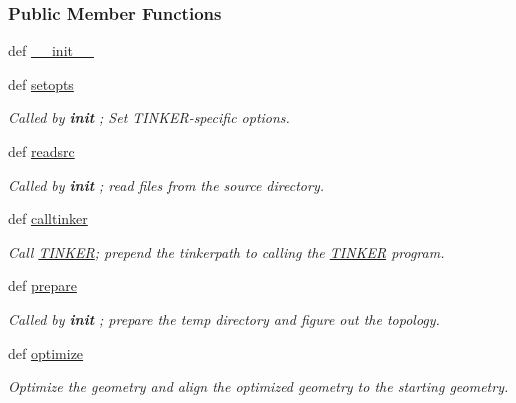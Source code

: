 \subsubsection*{Public Member Functions}
\begin{DoxyCompactItemize}
\item 
def \hyperlink{classforcebalance_1_1tinkerio_1_1TINKER_acf3c691c3b992262820a8e71cabefa32}{\-\_\-\-\_\-init\-\_\-\-\_\-}
\item 
def \hyperlink{classforcebalance_1_1tinkerio_1_1TINKER_a7b620772ae2ee1b71d91e45e19627d3d}{setopts}
\begin{DoxyCompactList}\small\item\em Called by {\bfseries init} ; Set T\-I\-N\-K\-E\-R-\/specific options. \end{DoxyCompactList}\item 
def \hyperlink{classforcebalance_1_1tinkerio_1_1TINKER_ac5490b42e2a13be406cd1701789b72b4}{readsrc}
\begin{DoxyCompactList}\small\item\em Called by {\bfseries init} ; read files from the source directory. \end{DoxyCompactList}\item 
def \hyperlink{classforcebalance_1_1tinkerio_1_1TINKER_addfa1257c7cb85c51c980474c7354cab}{calltinker}
\begin{DoxyCompactList}\small\item\em Call \hyperlink{classforcebalance_1_1tinkerio_1_1TINKER}{T\-I\-N\-K\-E\-R}; prepend the tinkerpath to calling the \hyperlink{classforcebalance_1_1tinkerio_1_1TINKER}{T\-I\-N\-K\-E\-R} program. \end{DoxyCompactList}\item 
def \hyperlink{classforcebalance_1_1tinkerio_1_1TINKER_adf31eba4afc23ec8326fc8b6461f5692}{prepare}
\begin{DoxyCompactList}\small\item\em Called by {\bfseries init} ; prepare the temp directory and figure out the topology. \end{DoxyCompactList}\item 
def \hyperlink{classforcebalance_1_1tinkerio_1_1TINKER_a98b822222eafd8dd16f474e1fdebd2bf}{optimize}
\begin{DoxyCompactList}\small\item\em Optimize the geometry and align the optimized geometry to the starting geometry. \end{DoxyCompactList}\item 

\end{DoxyCompactItemize}
